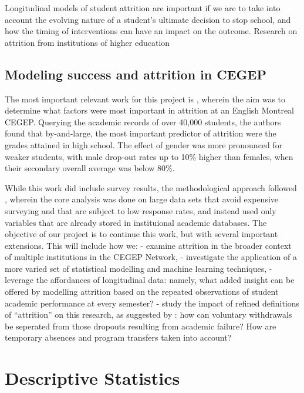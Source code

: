 \documentclass[]{book}
\theoremstyle{definition}
\theoremstyle{definition}
\theoremstyle{remark}
\begin{document}
Longitudinal models of student attrition are important if we are to take
into account the evolving nature of a student's ultimate decision to
stop school\citep{tinto1975dropout}, and how the timing of interventions
can have an impact on the outcome\citep{ishitani2002longitudinal}.
\citep{simons2011EarlyAlert} Research on attrition from institutions of
higher education \citep{singell_RHE_2010ModelingRetention}

\section{Modeling success and attrition in
CEGEP}\label{modeling-success-and-attrition-in-cegep}

The most important relevant work for this project is
\citep{jorgensen2009pareafinalreport}, wherein the aim was to determine
what factors were most important in attrition at an English Montreal
CEGEP. Querying the academic records of over 40,000 students, the
authors found that by-and-large, the most important predictor of
attrition were the grades attained in high school. The effect of gender
was more pronounced for weaker students, with male drop-out rates up to
10\% higher than females, when their secondary overall average was below
80\%.

While this work did include survey results, the methodological approach
followed \citep{desjardins1999event}, wherein the core analysis was done
on large data sets that avoid expensive surveying and that are subject
to low response rates, and instead used only variables that are already
stored in instituional academic databases. The objective of our project
is to continue this work, but with several important extensions. This
will include how we: - examine attrition in the broader context of
multiple institutions in the CEGEP Network, - investigate the
application of a more varied set of statistical modelling and machine
learning techniques, - leverage the affordances of longitudinal data:
namely, what added insight can be offered by modelling attrition based
on the repeated observations of student academic performance at every
semester? - study the impact of refined definitions of ``attrition'' on
this research, as suggested by \citep{tinto1975dropout}: how can
voluntary withdrawals be seperated from those dropouts resulting from
academic failure? How are temporary absences and program transfers taken
into account?

\hypertarget{descriptive}{\chapter{Descriptive
Statistics}\label{descriptive}}
\end{document}
